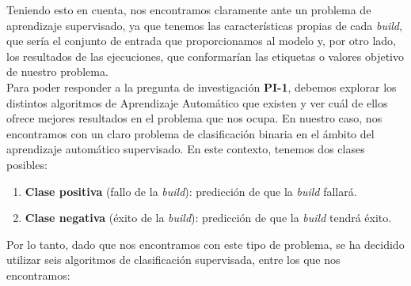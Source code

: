 Teniendo esto en cuenta, nos encontramos claramente ante un problema de aprendizaje supervisado,
ya que tenemos las características propias de cada \textit{build}, que sería el conjunto de
entrada que proporcionamos al modelo y, por otro lado, los resultados de las ejecuciones, que
conformarían las etiquetas o valores objetivo de nuestro problema.\\

Para poder responder a la pregunta de investigación \textbf{PI-1}, debemos explorar los
distintos algoritmos de Aprendizaje Automático que existen y ver cuál de ellos ofrece mejores
resultados en el problema que nos ocupa. En nuestro caso, nos encontramos con un claro problema
de clasificación binaria en el ámbito del aprendizaje automático supervisado. En este contexto,
tenemos dos clases posibles:
\begin{enumerate}
    \item \textbf{Clase positiva} (fallo de la \textit{build}): predicción de que la \textit{build}
    fallará.\\
    \item \textbf{Clase negativa} (éxito de la \textit{build}): predicción de que la \textit{build}
    tendrá éxito.
\end{enumerate}

Por lo tanto, dado que nos encontramos con este tipo de problema, se ha decidido utilizar seis
algoritmos de clasificación supervisada, entre los que nos encontramos:

